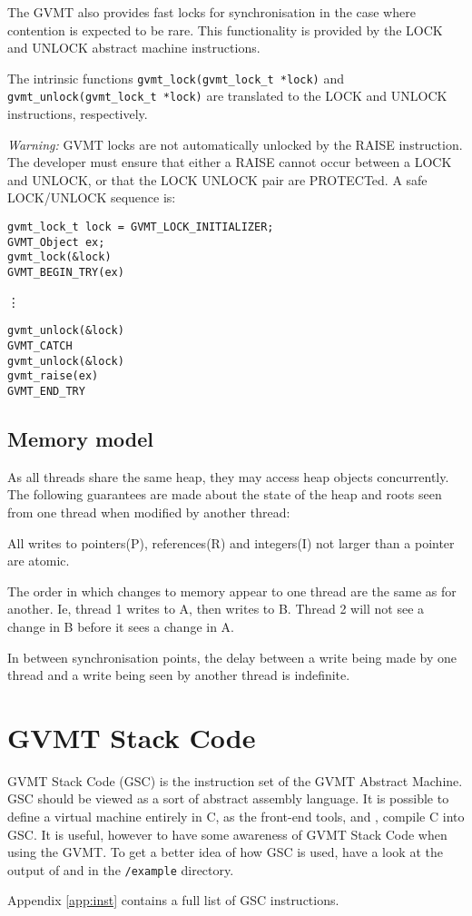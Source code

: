 The GVMT also provides fast locks for synchronisation in the case where contention is expected to be rare. This functionality is provided by the  LOCK and UNLOCK abstract machine instructions. 

The intrinsic functions \verb|gvmt_lock(gvmt_lock_t *lock)| and \verb|gvmt_unlock(gvmt_lock_t *lock)| are translated to the LOCK and UNLOCK instructions, respectively.

\emph{Warning:} GVMT locks are not automatically unlocked by the RAISE instruction. The developer must ensure that either a RAISE cannot occur between a LOCK and UNLOCK, or that the LOCK UNLOCK pair are PROTECTed. A safe LOCK/UNLOCK sequence is:
\begin{verbatim}
gvmt_lock_t lock = GVMT_LOCK_INITIALIZER;
GVMT_Object ex;
gvmt_lock(&lock)
GVMT_BEGIN_TRY(ex)
\end{verbatim}
\nopagebreak[4]
        \vdots
\nopagebreak[4]
\begin{verbatim}
gvmt_unlock(&lock)
GVMT_CATCH
gvmt_unlock(&lock)
gvmt_raise(ex)
GVMT_END_TRY
\end{verbatim}

\subsection{Memory model}
As all threads share the same heap, they may access heap objects concurrently. The following guarantees are made about the state of the heap and roots seen from one thread when modified by another thread:

All writes to pointers(P), references(R) and integers(I) not larger than a pointer are atomic. 


The order in which changes to memory appear to one thread are the same as for another. Ie, thread 1 writes to A, then writes to B. Thread 2 will not see a change in B before it sees a change in A.


In between synchronisation points, the delay between a write being made by one thread and a write being seen by another thread is indefinite.

\section{GVMT Stack Code}
GVMT Stack Code (GSC) is the instruction set of the GVMT Abstract Machine.
GSC should be viewed as a sort of abstract assembly language. It is possible to define a virtual machine entirely in C, as the front-end tools, \gvmtic{} and \gvmtc, compile C into GSC.
It is useful, however to have some awareness of GVMT Stack Code when using the GVMT.
To get a better idea of how GSC is used, have a look at the output of \gvmtc and \gvmtic in the \verb|/example| directory.

Appendix \ref{app:inst} contains a full list of GSC instructions.
